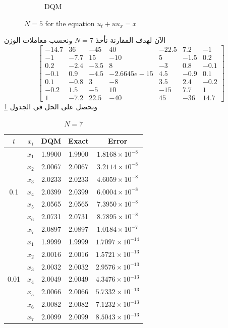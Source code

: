\begin{solution}
\begin{english}
\begin{figure}[ht]
\begin{subfigure}{0.3\textwidth}
			\caption{DQM}
		\end{subfigure}
		\caption{$N=5$ for the equation $u_t + u u_x = x$}
		\label{fig:secondexampleN5}
	\end{figure}
\end{english}
الآن لهدف المقارنة نأخذ $N=7$ ونحسب معاملات الوزن
\[
\begin{bmatrix}
	-14.7 & 36 & -45 & 40 & -22.5 & 7.2 & -1 \\
	-1 & -7.7 & 15 & -10 & 5 & -1.5 & 0.2 \\
	0.2 & -2.4 & -3.5 & 8 & -3 & 0.8 & -0.1 \\
	-0.1 & 0.9 & -4.5 & -2.6645e-15 & 4.5 & -0.9 & 0.1 \\
	0.1 & -0.8 & 3 & -8 & 3.5 & 2.4 & -0.2 \\
	-0.2 & 1.5 & -5 & 10 & -15 & 7.7 & 1 \\
	1 & -7.2 & 22.5 & -40 & 45 & -36 & 14.7
\end{bmatrix}
\]
ونحصل على الحل في الجدول \ref{tab:secondexN7}
\begin{english}
	\begin{table}[h!]
		\centering
		\begin{tabular}{|c|c|c|c|c|}
			\hline
			$t$ & $x_i$ & DQM & Exact & Error \\
			\hline
			\multirow{7}{*}{0.1} & $x_1$ & 1.9900 & 1.9900 & $1.8168 \times 10^{-8}$ \\
			& $x_2$ & 2.0067 & 2.0067 & $3.2114 \times 10^{-8}$ \\
			& $x_3$ & 2.0233 & 2.0233 & $4.6059 \times 10^{-8}$ \\
			& $x_4$ & 2.0399 & 2.0399 & $6.0004 \times 10^{-8}$ \\
			& $x_5$ & 2.0565 & 2.0565 & $7.3950 \times 10^{-8}$ \\
			& $x_6$ & 2.0731 & 2.0731 & $8.7895 \times 10^{-8}$ \\
			& $x_7$ & 2.0897 & 2.0897 & $1.0184 \times 10^{-7}$ \\
			\hline
			\multirow{7}{*}{0.01} & $x_1$ & 1.9999 & 1.9999 & $1.7097 \times 10^{-14}$ \\
			& $x_2$ & 2.0016 & 2.0016 & $1.5721 \times 10^{-13}$ \\
			& $x_3$ & 2.0032 & 2.0032 & $2.9576 \times 10^{-13}$ \\
			& $x_4$ & 2.0049 & 2.0049 & $4.3476 \times 10^{-13}$ \\
			& $x_5$ & 2.0066 & 2.0066 & $5.7332 \times 10^{-13}$ \\
			& $x_6$ & 2.0082 & 2.0082 & $7.1232 \times 10^{-13}$ \\
			& $x_7$ & 2.0099 & 2.0099 & $8.5043 \times 10^{-13}$ \\
			\hline
		\end{tabular}
		\caption{$N=7$}
	\label{tab:secondexN7}
	\end{table}
\end{english}


\end{solution}
